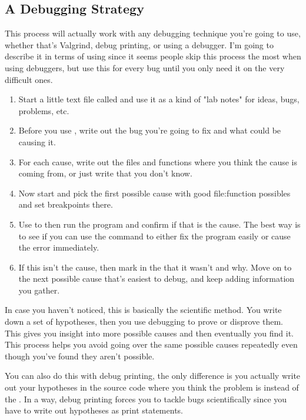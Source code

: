 \begin{enumerate}
\section{A Debugging Strategy}

This process will actually work with any debugging technique you're going to
use, whether that's Valgrind, debug printing, or using a debugger.  I'm going
to describe it in terms of using  since it seems people skip this
process the most when using debuggers, but use this for every bug until you
only need it on the very difficult ones.

\begin{enumerate}
\item Start a little text file called  and use it as a kind of
    "lab notes" for ideas, bugs, problems, etc.
\item Before you use , write out the bug you're going to fix
    and what could be causing it.
\item For each cause, write out the files and functions where you think 
    the cause is coming from, or just write that you don't know.
\item Now start  and pick the first possible cause with good
    file:function possibles and set breakpoints there.
\item Use  to then run the program and confirm if that is the
    cause.  The best way is to see if you can use the  command
    to either fix the program easily or cause the error immediately.
\item If this isn't the cause, then mark in the  that it
    wasn't and why.  Move on to the next possible cause that's easiest
    to debug, and keep adding information you gather.
\end{enumerate}

In case you haven't noticed, this is basically the scientific method.  You
write down a set of hypotheses, then you use debugging to prove or disprove
them.  This gives you insight into more possible causes and then eventually you
find it. This process helps you avoid going over the same possible causes
repeatedly even though you've found they aren't possible.

You can also do this with debug printing, the only difference is you actually
write out your hypotheses in the source code where you think the problem is
instead of the .  In a way, debug printing forces you to tackle
bugs scientifically since you have to write out hypotheses as print statements.



\end{enumerate}
